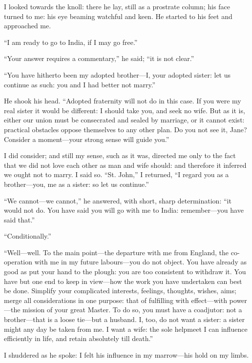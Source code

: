 I looked towards the knoll: there he lay, still as a prostrate column;
his face turned to me: his eye beaming watchful and keen. He started to
his feet and approached me.

\enquote{I am ready to go to India, if I may go free.}

\enquote{Your answer requires a commentary,} he said; \enquote{it is not
clear.}

\enquote{You have hitherto been my adopted brother---I, your adopted
sister: let us continue as such: you and I had better not marry.}

He shook his head. \enquote{Adopted fraternity will not do in this
case. If you were my real sister it would be different: I should take
you, and seek no wife. But as it is, either our union must be
consecrated and sealed by marriage, or it cannot exist: practical
obstacles oppose themselves to any other plan. Do you not see it,
Jane? Consider a moment---your strong sense will guide you.}

I did consider; and still my sense, such as it was, directed me only to
the fact that we did not love each other as man and wife should: and
therefore it inferred we ought not to marry. I said so. \enquote{St.
John,} I returned, \enquote{I regard you as a brother---you, me as a
sister: so let us continue.}

\enquote{We cannot---we cannot,} he answered, with short, sharp
determination: \enquote{it would not do. You have said you will go with
me to India: remember---you have said that.}

\enquote{Conditionally.}

\enquote{Well---well. To the main point---the departure with me from
England, the co-operation with me in my future labours---you do not
object. You have already as good as put your hand to the plough: you
are too consistent to withdraw it. You have but one end to keep in
view---how the work you have undertaken can best be done. Simplify your
complicated interests, feelings, thoughts, wishes, aims; merge all
considerations in one purpose: that of fulfilling with effect---with
power---the mission of your great Master. To do so, you must have a
coadjutor: not a brother---that is a loose tie---but a husband. I, too,
do not want a sister: a sister might any day be taken from me. I want a
wife: the sole helpmeet I can influence efficiently in life, and retain
absolutely till death.}

I shuddered as he spoke: I felt his influence in my marrow---his hold on
my limbs.

